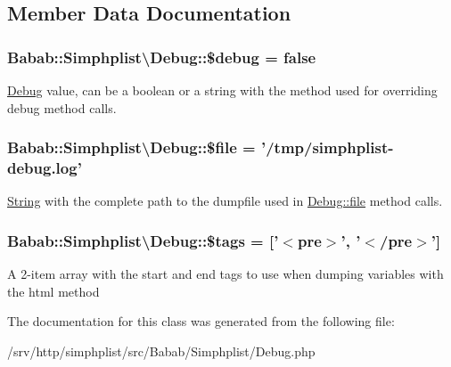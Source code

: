 \subsection{Member Data Documentation}
\hypertarget{classBabab_1_1Simphplist_1_1Debug_a5e23afa4b737164198d703572f3ecf6a}{
\subsubsection[{\$debug}]{\setlength{\rightskip}{0pt plus 5cm}Babab\+::\+Simphplist\textbackslash{}\+Debug\+::\$debug = false\hspace{0.3cm}{\ttfamily [static]}}}\label{classBabab_1_1Simphplist_1_1Debug_a5e23afa4b737164198d703572f3ecf6a}
\hyperlink{classBabab_1_1Simphplist_1_1Debug}{Debug} value, can be a boolean or a string with the method used for overriding debug method calls. \hypertarget{classBabab_1_1Simphplist_1_1Debug_a04219b8bad8e1699038c301c0d7b3145}{
\subsubsection[{\$file}]{\setlength{\rightskip}{0pt plus 5cm}Babab\+::\+Simphplist\textbackslash{}\+Debug\+::\$file = '/tmp/simphplist-\/debug.\+log'\hspace{0.3cm}{\ttfamily [static]}}}\label{classBabab_1_1Simphplist_1_1Debug_a04219b8bad8e1699038c301c0d7b3145}
\hyperlink{classBabab_1_1Simphplist_1_1String}{String} with the complete path to the dumpfile used in \hyperlink{classBabab_1_1Simphplist_1_1Debug_a9bcd51c08a5b03c356df1014150d492d}{Debug\+::file} method calls. \hypertarget{classBabab_1_1Simphplist_1_1Debug_a1a1a6bf5387c2ed978a5d2c143598117}{
\subsubsection[{\$tags}]{\setlength{\rightskip}{0pt plus 5cm}Babab\+::\+Simphplist\textbackslash{}\+Debug\+::\$tags = \mbox{[}'$<$pre$>$', '$<$/pre$>$'\mbox{]}\hspace{0.3cm}{\ttfamily [static]}}}\label{classBabab_1_1Simphplist_1_1Debug_a1a1a6bf5387c2ed978a5d2c143598117}
A 2-\/item array with the start and end tags to use when dumping variables with the {\ttfamily html} method 

The documentation for this class was generated from the following file\+:\begin{DoxyCompactItemize}
\item 
/srv/http/simphplist/src/\+Babab/\+Simphplist/Debug.\+php\end{DoxyCompactItemize}

